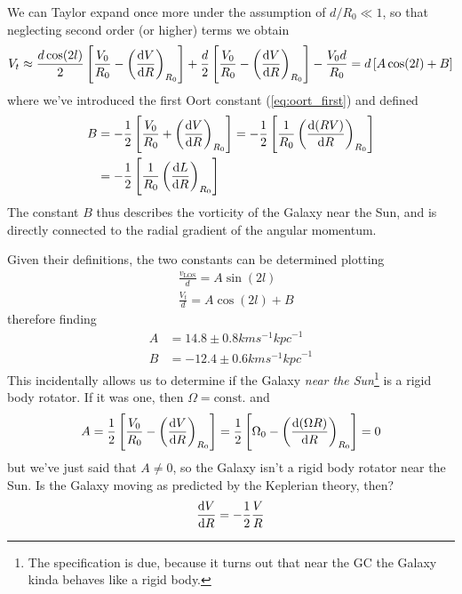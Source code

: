 We can Taylor expand once more under the assumption of $d/R_{0}\ll 1$, so that neglecting second order (or higher) terms we obtain 
\begin{equation*}
    V_{t} \approx \frac{d\cos(2l)}{2}\left[\frac{V_{0}}{R_{0}}-\left(\frac{\text{d}V}{\text{d}R}\right)_{R_{0}}\right]+\frac{d}{2}\left[\frac{V_{0}}{R_{0}}-\left(\frac{\text{d}V}{\text{d}R}\right)_{R_{0}}\right]-\frac{V_{0}d}{R_{0}} = d\left[A\cos(2l)+B\right]
\end{equation*}
where we've introduced the first Oort constant (\ref{eq:oort_first}) and defined 
\begin{align}
    B &= -\frac{1}{2}\left[\frac{V_{0}}{R_{0}}+\left(\frac{\text{d}V}{\text{d}R}\right)_{R_{0}}\right] = -\frac{1}{2}\left[\frac{1}{R_{0}}\left(\frac{\text{d}(RV)}{\text{d}R}\right)_{R_{0}}\right]\\
    & = -\frac{1}{2}\left[\frac{1}{R_{0}}\left(\frac{\text{d}L}{\text{d}R}\right)_{R_{0}}\right]
    \label{eq:oort_second}
\end{align}
The constant $B$ thus describes the vorticity of the Galaxy near the Sun, and is directly connected to the radial gradient of the angular momentum.
\par Given their definitions, the two constants can be determined plotting 
\begin{align*}
    & \frac{v_{\text{LOS}}}{d} = A\sin(2l)\\
    & \frac{V_{t}}{d} = A\cos(2l)+B
\end{align*}
therefore finding
\begin{align*}
    A &= 14.8 \pm 0.8 \unit{km}\unit{s}^{-1}\unit{kpc}^{-1}\\
    B &= -12.4 \pm 0.6 \unit{km}\unit{s}^{-1}\unit{kpc}^{-1}
\end{align*}
This incidentally allows us to determine if the Galaxy \emph{near the Sun}\footnote{The specification is due, because it turns out that near the GC the Galaxy kinda behaves like a rigid body.} is a rigid body rotator. If it was one, then $\Omega = \text{const.}$ and 
\begin{equation*}
    A = \frac{1}{2}\left[\frac{V_{0}}{R_{0}}-\left(\frac{\text{d}V}{\text{d}R}\right)_{R_{0}}\right] = \frac{1}{2}\left[\Omega_{0}-\left(\frac{\text{d}(\Omega R)}{\text{d}R}\right)_{R_{0}}\right] = 0
\end{equation*}
but we've just said that $A \neq 0$, so the Galaxy isn't a rigid body rotator near the Sun. Is the Galaxy moving as predicted by the Keplerian theory, then?
\begin{equation*}
    \frac{\text{d}V}{\text{d}R} = -\frac{1}{2}\frac{V}{R}
\end{equation*}
